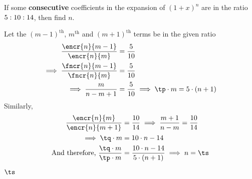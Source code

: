 



\ADD\va\vb\tp
\ADD\vb\vc\tq
\EXPR[2]\tr{\tq / \tp}
\EXPR[0]\ts{(\tr * \va + \vc) / (\vb - \tr * \va)}

\question[4] If some \textbf{consecutive} coefficients in the expansion of $(1+x)^n$ are in the 
ratio $5:10:14$, then find $n$.

\watchout

\begin{solution}[\halfpage]
	Let the $(m-1)^{\text{th}}$, $m^{\text{th}}$ and $(m+1)^{\text{th}}$ terms be in the given ratio
	\begin{align}
		\dfrac{\encr{n}{m-1}}{\encr{n}{m}} &= \dfrac{\va}{\vb} \\
		\implies \dfrac{\fncr{n}{m-1}}{\fncr{n}{m}} &= \dfrac{\va}{\vb} \\
		\implies \dfrac{m}{n-m+1} &= \dfrac{\va}{\vb} \implies \tp\cdot m = \va\cdot(n+1)
	\end{align}
	Similarly,
	\begin{align}
		\dfrac{\encr{n}{m}}{\encr{n}{m+1}} &= \dfrac{\vb}{\vc} \implies \dfrac{m+1}{n-m} = \dfrac{\vb}{\vc} \\
		\implies \tq\cdot m &= \vb\cdot n - \vc \\
		\text{And therefore, } \dfrac{\tq\cdot m}{\tp\cdot m} &= \dfrac{\vb\cdot n - \vc}{\va\cdot(n+1)}\implies n = \ts
	\end{align}
\end{solution}

\ifprintanswers\begin{codex}$\ts$\end{codex}\fi
